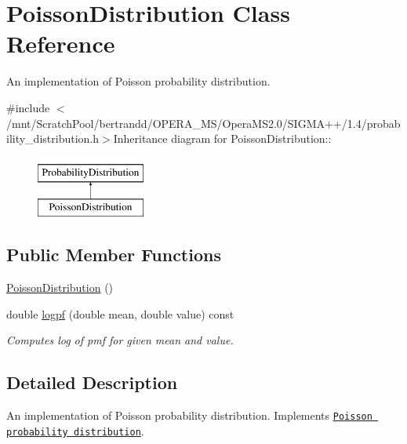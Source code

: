 \hypertarget{classPoissonDistribution}{
\section{PoissonDistribution Class Reference}
\label{classPoissonDistribution}
}


An implementation of Poisson probability distribution.  


{\ttfamily \#include $<$/mnt/ScratchPool/bertrandd/OPERA\_\-MS/OperaMS2.0/SIGMA++/1.4/probability\_\-distribution.h$>$}Inheritance diagram for PoissonDistribution::\begin{figure}[H]
\begin{center}
\leavevmode
\includegraphics[height=2cm]{classPoissonDistribution}
\end{center}
\end{figure}
\subsection*{Public Member Functions}
\begin{DoxyCompactItemize}
\item 
\hyperlink{classPoissonDistribution_a9dae9524ab51e52edd25a125d63d7376}{PoissonDistribution} ()
\item 
double \hyperlink{classPoissonDistribution_ae4bb9a4af35078b03fdf3778644d529d}{logpf} (double mean, double value) const 
\begin{DoxyCompactList}\small\item\em Computes log of pmf for given mean and value. \item\end{DoxyCompactList}\end{DoxyCompactItemize}


\subsection{Detailed Description}
An implementation of Poisson probability distribution. Implements \href{http://en.wikipedia.org/wiki/Poisson_distribution}{\tt Poisson probability distribution}. 

